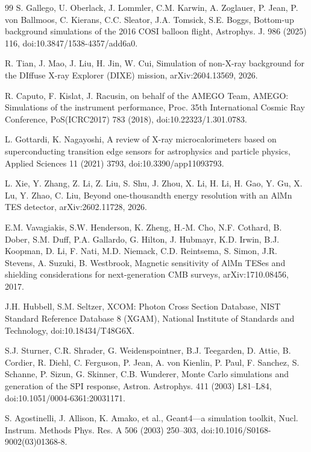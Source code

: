 \documentclass[11pt]{article}
\begin{document}
\begin{thebibliography}{99}
S. Gallego, U. Oberlack, J. Lommler, C.M. Karwin, A. Zoglauer, P. Jean, P. von Ballmoos, C. Kierans, C.C. Sleator, J.A. Tomsick, S.E. Boggs, Bottom-up background simulations of the 2016 COSI balloon flight, Astrophys. J. 986 (2025) 116, doi:10.3847/1538-4357/add6a0.

R. Tian, J. Mao, J. Liu, H. Jin, W. Cui, Simulation of non-X-ray background for the DIffuse X-ray Explorer (DIXE) mission, arXiv:2604.13569, 2026.

R. Caputo, F. Kislat, J. Racusin, on behalf of the AMEGO Team, AMEGO: Simulations of the instrument performance, Proc. 35th International Cosmic Ray Conference, PoS(ICRC2017) 783 (2018), doi:10.22323/1.301.0783.

L. Gottardi, K. Nagayoshi, A review of X-ray microcalorimeters based on superconducting transition edge sensors for astrophysics and particle physics, Applied Sciences 11 (2021) 3793, doi:10.3390/app11093793.

L. Xie, Y. Zhang, Z. Li, Z. Liu, S. Shu, J. Zhou, X. Li, H. Li, H. Gao, Y. Gu, X. Lu, Y. Zhao, C. Liu, Beyond one-thousandth energy resolution with an AlMn TES detector, arXiv:2602.11728, 2026.

E.M. Vavagiakis, S.W. Henderson, K. Zheng, H.-M. Cho, N.F. Cothard, B. Dober, S.M. Duff, P.A. Gallardo, G. Hilton, J. Hubmayr, K.D. Irwin, B.J. Koopman, D. Li, F. Nati, M.D. Niemack, C.D. Reintsema, S. Simon, J.R. Stevens, A. Suzuki, B. Westbrook, Magnetic sensitivity of AlMn TESes and shielding considerations for next-generation CMB surveys, arXiv:1710.08456, 2017.

J.H. Hubbell, S.M. Seltzer, XCOM: Photon Cross Section Database, NIST Standard Reference Database 8 (XGAM), National Institute of Standards and Technology, doi:10.18434/T48G6X.

S.J. Sturner, C.R. Shrader, G. Weidenspointner, B.J. Teegarden, D. Attie, B. Cordier, R. Diehl, C. Ferguson, P. Jean, A. von Kienlin, P. Paul, F. Sanchez, S. Schanne, P. Sizun, G. Skinner, C.B. Wunderer, Monte Carlo simulations and generation of the SPI response, Astron. Astrophys. 411 (2003) L81--L84, doi:10.1051/0004-6361:20031171.

S. Agostinelli, J. Allison, K. Amako, et al., Geant4---a simulation toolkit, Nucl. Instrum. Methods Phys. Res. A 506 (2003) 250--303, doi:10.1016/S0168-9002(03)01368-8.


\end{thebibliography}
\end{document}

